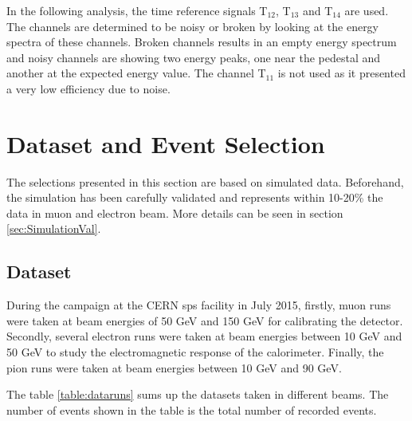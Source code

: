In the following analysis, the time reference signals T$_{12}$, T$_{13}$ and T$_{14}$ are used. The channels are determined to be noisy or broken by looking at the energy spectra of these channels. Broken channels results in an empty energy spectrum and noisy channels are showing two energy peaks, one near the pedestal and another at the expected energy value. The channel T$_{11}$ is not used as it presented a very low efficiency due to noise.

\section{Dataset and Event Selection}

The selections presented in this section are based on simulated data. Beforehand, the simulation has been carefully validated and represents within 10-20\% the data in muon and electron beam. More details can be seen in section \ref{sec:SimulationVal}.

\subsection{Dataset}
\label{subsec:dataset}

During the campaign at the CERN \acrshort{sps} facility in July 2015, firstly, muon runs were taken at beam energies of 50 GeV and 150 GeV for calibrating the detector. Secondly, several electron runs were taken at beam energies between 10 GeV and 50 GeV to study the electromagnetic response of the calorimeter. Finally, the pion runs were taken at beam energies between 10 GeV and 90 GeV.

The table \ref{table:dataruns} sums up the datasets taken in different beams. The number of events shown in the table is the total number of recorded events.

